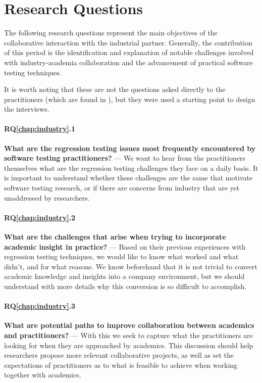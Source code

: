 \section{Research Questions}
\label{sec:ind_rqs}

The following research questions represent the main objectives of the collaborative interaction with the industrial partner.
Generally, the contribution of this period is the identification and explanation of notable challenges involved with industry-academia collaboration and the advancement of practical software testing techniques.

It is worth noting that these are not the questions asked directly to the practitioners (which are found in ), but they were used a starting point to design the interviews.

\paragraph{RQ\ref{chap:industry}.1}\label{rq:ind1} \textbf{What are the regression testing issues most frequently encountered by software testing practitioners?} --- We want to hear from the practitioners themselves what are the regression testing challenges they face on a daily basis.
It is important to understand whether these challenges are the same that motivate software testing research, or if there are concerns from industry that are yet unaddressed by researchers.

\paragraph{RQ\ref{chap:industry}.2}\label{rq:ind2} \textbf{What are the challenges that arise when trying to incorporate academic insight in practice?} --- Based on their previous experiences with regression testing techniques, we would like to know what worked and what didn't, and for what reasons.
We know beforehand that it is not trivial to convert academic knowledge and insights into a company environment, but we should understand with more details why this conversion is so difficult to accomplish.

\paragraph{RQ\ref{chap:industry}.3}\label{rq:ind3} \textbf{What are potential paths to improve collaboration between academics and practitioners?} --- With this we seek to capture what the practitioners are looking for when they are approached by academics.
This discussion should help researchers propose more relevant collaborative projects, as well as set the expectations of practitioners as to what is feasible to achieve when working together with academics.

